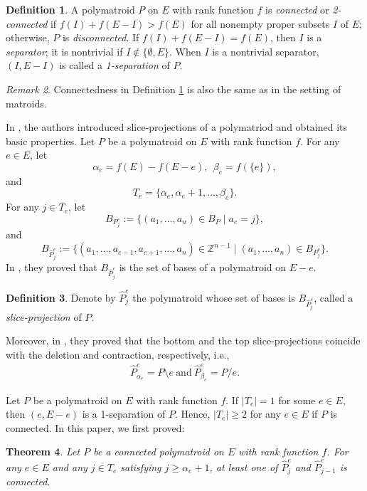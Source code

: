 \documentclass[preprint,10pt]{elsarticle}
\theoremstyle{plain}
\newtheorem{theorem}{Theorem}[section]
\theoremstyle{definition}
\newtheorem{definition}[theorem]{Definition}
\theoremstyle{remark}
\newtheorem{remark}[theorem]{Remark}
\begin{document}
\begin{definition}\label{def-co}
A polymatroid $P$ on $E$ with rank function $f$ is \emph{connected} or \emph{2-connected} if $f(I)+f(E-I) > f(E)$ for all nonempty proper subsets $I$ of $E$; otherwise, $P$ is \emph{disconnected}.
If $f(I)+f(E-I)=f(E)$, then $I$ is a \emph{separator}; it is nontrivial if $I \notin \{\emptyset, E\}$. When $I$ is a nontrivial separator, $(I,E-I)$ is called a \emph{1-separation} of $P$.
\end{definition}

\begin{remark}
Connectedness in Definition \ref{def-co} is also the same as in the setting of matroids.
\end{remark}


In \cite{Guan4}, the authors introduced slice-projections of a polymatriod and obtained its basic properties. Let $P$ be a polymatroid on $E$ with rank function $f$. For any $e\in E$, let
$$\alpha_{e}=f(E)-f(E-e),~~\beta_{e}=f(\{e\}),$$  and $$T_{e}=\{\alpha_{e}, \alpha_{e}+1,\ldots,\beta_{e}\}.$$
For any $j\in T_{e}$, let
 $$B_{P^{e}_{j}}:=\{(a_{1},\ldots,a_{n})\in B_{P}\mid a_{e}=j\},$$ and
\begin{equation*}\label{projection}
B_{\widehat{P}^{e}_{j}}:=\{(a_{1},\ldots,a_{e-1},a_{e+1},\ldots,a_{n})\in \mathbb{Z}^{n-1}\mid (a_{1},\ldots,a_{n})\in B_{P^{e}_{j}}\}.
\end{equation*}
In \cite{Guan4}, they proved that $B_{\widehat{P}^{e}_{j}}$ is the set of bases of a polymatroid on $E-e$.
\begin{definition}
Denote by $\widehat{P}^{e}_{j}$ the polymatroid whose set of bases is $B_{\widehat{P}^{e}_{j}}$, called a \emph{slice-projection} of $P$.
\end{definition}
Moreover, in \cite{Guan4}, they proved that the bottom and the top slice-projections coincide with the deletion and contraction, respectively, i.e.,
 \begin{eqnarray}\label{Del-Con}
 \widehat{P}^{e}_{\alpha_{e}}=P\setminus e\ \text{and} \ \widehat{P}^{e}_{\beta_{e}}=P/e.
\end{eqnarray}


Let $P$ be a polymatroid on $E$ with rank function $f$. If $|T_{e}|=1$ for some $e\in E$, then $(e,E-e)$ is a 1-separation of $P$. Hence,  $|T_{e}|\geq 2$ for any $e\in E$ if $P$ is connected. In this paper, we first proved:

\begin{theorem}\label{I-j}
Let $P$ be a connected polymatroid on $E$ with rank function $f$. For any $e\in E$ and any $j\in T_{e}$ satisfying $j\geq \alpha_{e}+1$, at least one of $\widehat{P}^{e}_{j}$ and $\widehat{P}^{e}_{j-1}$ is connected.
\end{theorem}
\end{document}
